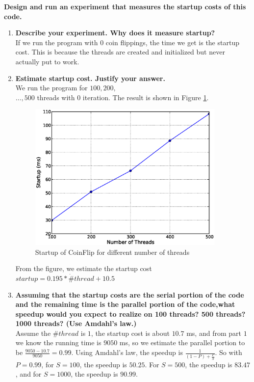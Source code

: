 \documentclass[letterpaper, 11pt]{article}
\begin{document}
\textbf{Design and run an experiment that measures the startup costs of this code.}
\begin{enumerate}
    \item \textbf{Describe your experiment. Why does it measure startup?}\\
        If we run the program with $0$ coin flippings, the time we get is the startup cost. This is because the threads are created and initialized but never actually put to work. 
    \item \textbf{Estimate startup cost. Justify your answer.}\\
        We run the program for $100, 200,$\\$ \dots, 500$ threads with $0$ iteration. The result is shown in Figure \ref{fig:coinstartup}.

        \begin{figure}[htbp]
            \centering
            \includegraphics[width=3.8in]{coinstartup.eps}
            \caption{Startup of CoinFlip for different number of threads}
            \label{fig:coinstartup}
        \end{figure}
        From the figure, we estimate the startup cost $startup = 0.195 * \dot \#thread + 10.5$
    \item \textbf{Assuming that the startup costs are the serial portion of the code and the remaining time is the parallel portion of the code,what speedup would you expect to realize on 100 threads? 500 threads? 1000 threads? (Use Amdahl's law.)}\\
        Assume the $\#thread$ is $1$, the startup cost is about $10.7$ ms, and from part $1$ we know the running time is $9050$ ms, so we estimate the parallel portion to be $\frac{9050-10.7}{9050}=0.99$. Using Amdahl's law, the speedup is $\frac{1}{(1-P)+\frac{P}{S}}$.
        So with $P=0.99$, for $S=100$, the speedup is $50.25$. For $S=500$, the speedup is $83.47$, and for $S=1000$, the speedup is $90.99$.
\end{enumerate}
\newpage
\newpage
\end{document}
